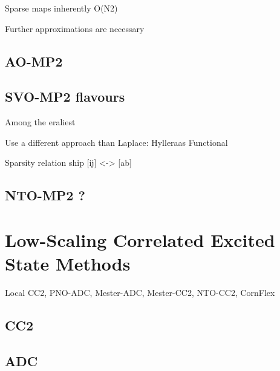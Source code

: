Sparse maps inherently O(N2)

Further approximations are necessary


\subsection{AO-MP2}


\subsection{SVO-MP2 flavours}

Among the eraliest

Use a different approach than Laplace: Hylleraas Functional

Sparsity relation ship [ij] <-> [ab]

\subsection{NTO-MP2 ?}




\section{Low-Scaling Correlated Excited State Methods}
Local CC2, PNO-ADC, Mester-ADC, Mester-CC2, NTO-CC2, CornFlex


\subsection{CC2}


\subsection{ADC}

